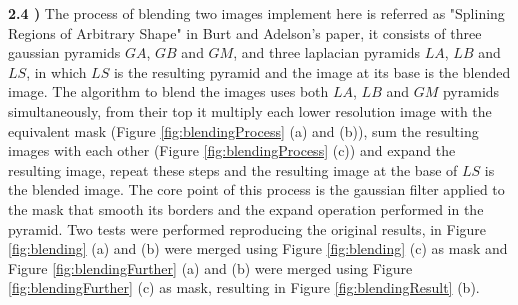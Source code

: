 \documentclass[12pt,a4paper]{article}
\begin{document}
\textbf{2.4 )} The process of blending two images implement here is referred as "Splining Regions of Arbitrary Shape" in Burt and Adelson's paper, it consists of three gaussian pyramids $GA$, $GB$ and $GM$, and three laplacian pyramids $LA$, $LB$ and $LS$, in which $LS$ is the resulting pyramid and the image at its base is the blended image. The algorithm to blend the images uses both $LA$, $LB$ and $GM$ pyramids simultaneously, from their top it multiply each lower resolution image with the equivalent mask (Figure \ref{fig:blendingProcess} (a) and (b)), sum the resulting images with each other (Figure \ref{fig:blendingProcess} (c)) and expand the resulting image, repeat these steps and the resulting image at the base of $LS$ is the blended image. The core point of this process is the gaussian filter applied to the mask that smooth its borders and the expand operation performed in the pyramid. Two tests were performed reproducing the original results, in Figure \ref{fig:blending} (a) and (b) were merged using Figure \ref{fig:blending} (c) as mask and Figure \ref{fig:blendingFurther} (a) and (b) were merged using Figure \ref{fig:blendingFurther} (c) as mask, resulting in Figure \ref{fig:blendingResult} (b).
\end{document}
